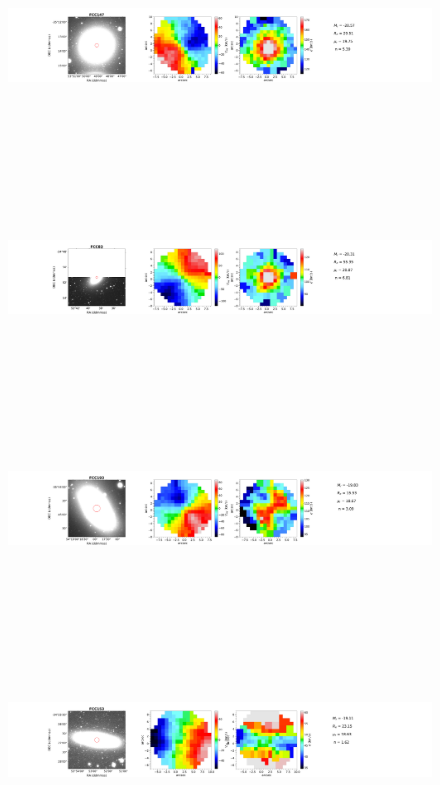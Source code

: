 \documentclass{aa}
\begin{document}
\begin{figure}[!htb]
   \ContinuedFloat
   \centering
   \includegraphics[width=21cm,height=6cm,keepaspectratio]
{../2_pipeline/1_V&S_Maps/147Velocity_map.pdf}
   \includegraphics[width=21cm,height=6cm,keepaspectratio]{../2_pipeline/1_V&S_Maps/83Velocity_map.pdf}
   \includegraphics[width=21cm,height=6cm,keepaspectratio]{../2_pipeline/1_V&S_Maps/193Velocity_map.pdf}
   \includegraphics[width=21cm,height=6cm,keepaspectratio]{../2_pipeline/1_V&S_Maps/153Velocity_map.pdf}

\end{figure}
\end{document}
